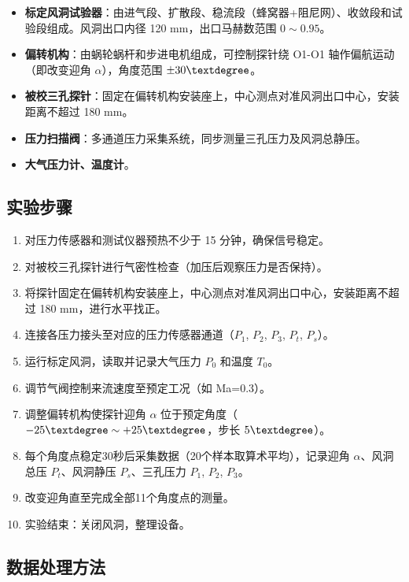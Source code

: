 \begin{itemize}
    \item \textbf{标定风洞试验器}：由进气段、扩散段、稳流段（蜂窝器+阻尼网）、收敛段和试验段组成。风洞出口内径 120 mm，出口马赫数范围 $0 \sim 0.95$。
    \item \textbf{偏转机构}：由蜗轮蜗杆和步进电机组成，可控制探针绕 O1-O1 轴作偏航运动（即改变迎角 $\alpha$），角度范围 $\pm 30\textdegree$。
    \item \textbf{被校三孔探针}：固定在偏转机构安装座上，中心测点对准风洞出口中心，安装距离不超过 180 mm。
    \item \textbf{压力扫描阀}：多通道压力采集系统，同步测量三孔压力及风洞总静压。
    \item \textbf{大气压力计、温度计}。
\end{itemize}

\subsection{实验步骤}

\begin{enumerate}
    \item 对压力传感器和测试仪器预热不少于 15 分钟，确保信号稳定。
    \item 对被校三孔探针进行气密性检查（加压后观察压力是否保持）。
    \item 将探针固定在偏转机构安装座上，中心测点对准风洞出口中心，安装距离不超过 180 mm，进行水平找正。
    \item 连接各压力接头至对应的压力传感器通道（$P_1$, $P_2$, $P_3$, $P_t$, $P_s$）。
    \item 运行标定风洞，读取并记录大气压力 $P_0$ 和温度 $T_0$。
    \item 调节气阀控制来流速度至预定工况（如 Ma=0.3）。
    \item 调整偏转机构使探针迎角 $\alpha$ 位于预定角度（$-25\textdegree \sim +25\textdegree$，步长 $5\textdegree$）。
    \item 每个角度点稳定30秒后采集数据（20个样本取算术平均），记录迎角 $\alpha$、风洞总压 $P_t$、风洞静压 $P_s$、三孔压力 $P_1$, $P_2$, $P_3$。
    \item 改变迎角直至完成全部11个角度点的测量。
    \item 实验结束：关闭风洞，整理设备。
\end{enumerate}

\subsection{数据处理方法}

